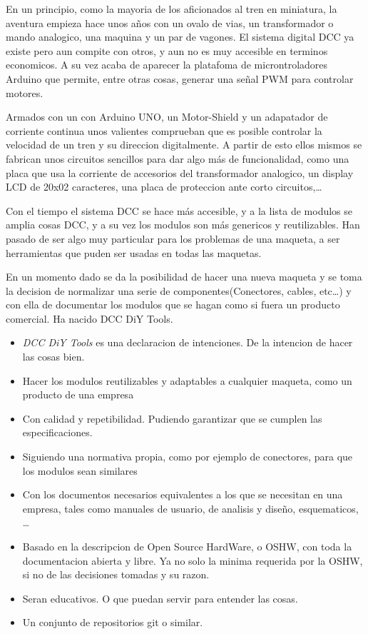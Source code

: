 
En un principio, como la mayoria de los aficionados al tren en miniatura, la aventura empieza hace unos años con un ovalo de vias,
un transformador o mando analogico, una maquina y un par de vagones. El sistema digital DCC ya existe pero aun compite con otros,
y aun no es muy accesible en terminos economicos. A su vez acaba de aparecer la platafoma de microntroladores Arduino que permite,
entre otras cosas, generar una señal PWM para controlar motores.

Armados con un con Arduino UNO, un Motor-Shield y un adapatador de corriente continua unos valientes comprueban que es posible
controlar la velocidad de un tren y su direccion digitalmente. A partir de esto ellos mismos se fabrican unos circuitos sencillos
para dar algo más de funcionalidad, como una placa que usa la corriente de accesorios del transformador analogico, un display
LCD de 20x02 caracteres, una placa de proteccion ante corto circuitos,\dots

Con el tiempo el sistema DCC se hace más accesible, y a la lista de modulos se amplia cosas DCC, y a su vez los modulos son más
genericos y reutilizables. Han pasado de ser algo muy particular para los problemas de
una maqueta, a ser herramientas que puden ser usadas en todas las maquetas.

En un momento dado se da la posibilidad de hacer una nueva maqueta y se toma la decision de normalizar una serie de componentes(Conectores, cables, etc\dots) y con ella de documentar los modulos que se hagan
como si fuera un producto comercial. Ha nacido DCC DiY Tools.
\begin{itemize}
    \item \textit{DCC DiY Tools} es una declaracion de intenciones. De la intencion de hacer las cosas bien.
    \item Hacer los modulos reutilizables y adaptables a cualquier maqueta, como un producto de una empresa
    \item Con calidad y repetibilidad. Pudiendo garantizar que se cumplen las especificaciones. 
    \item Siguiendo una normativa propia, como por ejemplo de conectores, para que los modulos sean similares
    \item Con los documentos necesarios equivalentes a los que se necesitan en una empresa, tales como manuales de usuario, de 
    analisis y diseño, esquematicos, \dots
    \item Basado en la descripcion de Open Source HardWare, o OSHW, con toda la documentacion abierta y libre. Ya no solo la 
    minima requerida por la OSHW, si no de las decisiones tomadas y su razon.
    \item Seran educativos. O que puedan servir para entender las cosas.
    \item Un conjunto de repositorios git o similar.
\end{itemize}

